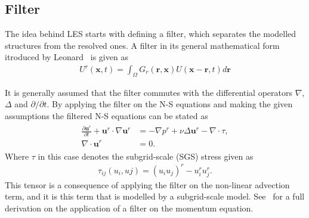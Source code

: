 \subsection{Filter}
The idea behind LES starts with defining a filter, which separates the modelled structures from the resolved ones. 
A filter in its general mathematical form itroduced by Leonard~\cite{Leonard} is given as 
\begin{align}
    U^r(\mathbf{x},t) = \int_{\Omega} G_r(\mathbf{r},\mathbf{x})U(\mathbf{x}-\mathbf{r},t)d\mathbf{r}
    \label{eq:filter}
\end{align}


 
It is generally assumed that the filter commutes with 
the differential operators $\nabla$, $\Delta$ and $\partial / \partial t$. By applying the filter on the N-S equations
and making the given assumptions the filtered N-S equations can be stated as 
%
\begin{align}
    \begin{split}
        \frac{\partial \mathbf{u}^r}{\partial t} + \mathbf{u}^r\cdot \nabla\mathbf{u}^r
        &= -\nabla p^r +\nu\Delta \mathbf{u}^r-\nabla \cdot \tau, \\
        \nabla \cdot \mathbf{u}^r &= 0.
    \end{split}
	\label{eq:NSfiltered}
\end{align}
%
Where $\tau$ in this case denotes the subgrid-scale (SGS) stress given as 
\begin{align}
    \tau_{ij}(u_i,uj) = (u_iu_j)^r -u_i^ru_j^r.
    \label{eq:sgstensor}
\end{align}
%
This tensor is a consequence of applying the filter on the non-linear advection term, 
and it is this term that is modelled by a subgrid-scale model. See~\cite{Pope} for a full derivation on the 
application of a filter on the momentum equation. 

